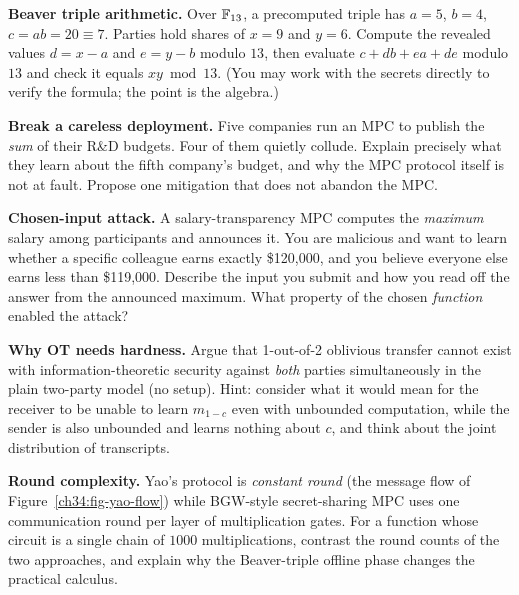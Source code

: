 \begin{exercise}
\textbf{Beaver triple arithmetic.} Over $\mathbb{F}_{13}$, a precomputed triple has $a = 5$, $b = 4$, $c = ab = 20 \equiv 7$. Parties hold shares of $x = 9$ and $y = 6$. Compute the revealed values $d = x - a$ and $e = y - b$ modulo $13$, then evaluate $c + db + ea + de$ modulo $13$ and check it equals $xy \bmod 13$. (You may work with the secrets directly to verify the formula; the point is the algebra.)
\end{exercise}

\begin{exercise}
\textbf{Break a careless deployment.} Five companies run an MPC to publish the \emph{sum} of their R\&D budgets. Four of them quietly collude. Explain precisely what they learn about the fifth company's budget, and why the MPC protocol itself is not at fault. Propose one mitigation that does not abandon the MPC.
\end{exercise}

\begin{exercise}
\textbf{Chosen-input attack.} A salary-transparency MPC computes the \emph{maximum} salary among participants and announces it. You are malicious and want to learn whether a specific colleague earns exactly \$120{,}000, and you believe everyone else earns less than \$119{,}000. Describe the input you submit and how you read off the answer from the announced maximum. What property of the chosen \emph{function} enabled the attack?
\end{exercise}

\begin{exercise}
\textbf{Why OT needs hardness.} Argue that 1-out-of-2 oblivious transfer cannot exist with information-theoretic security against \emph{both} parties simultaneously in the plain two-party model (no setup). Hint: consider what it would mean for the receiver to be unable to learn $m_{1-c}$ even with unbounded computation, while the sender is also unbounded and learns nothing about $c$, and think about the joint distribution of transcripts.
\end{exercise}

\begin{exercise}
\textbf{Round complexity.} Yao's protocol is \emph{constant round} (the message flow of Figure~\ref{ch34:fig-yao-flow}) while BGW-style secret-sharing MPC uses one communication round per layer of multiplication gates. For a function whose circuit is a single chain of $1000$ multiplications, contrast the round counts of the two approaches, and explain why the Beaver-triple offline phase changes the practical calculus.
\end{exercise}
